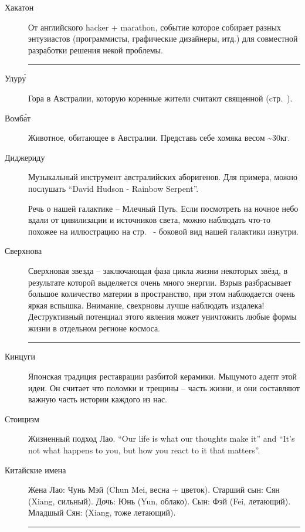 \documentclass[a5paper,11pt]{memoir}
\begin{document}
\begin{description}

\item[Хакатон] От английского hacker + marathon, событие которое собирает разных энтузиастов (программисты, графические дизайнеры, итд.) для совместной разработки решения некой проблемы. 
\fancybreak{*}

\item[Улур\'{у}] Гора в Австралии, которую коренные жители считают священной (cтр.~\pageref{uluru}).

\item[Вомб\'{а}т] Животное, обитающее в Австралии. Представь себе хомяка весом \textasciitilde30кг.

\item[Диджериду] Музыкальный инструмент австралийских аборигенов. Для примера, можно послушать ``David Hudson - Rainbow Serpent''. 

\item[] Речь о нашей галактике -- Млечный Путь. Если посмотреть на ночное небо вдали от цивилизации и источников света, можно наблюдать что-то похожее на иллюстрацию на стр.~\pageref{milky-way} - боковой вид нашей галактики изнутри.

\item[Сверхнова] Сверхновая звезда -- заключающая фаза цикла жизни некоторых звёзд, в результате которой выделяется очень много энергии. Взрыв разбрасывает большое количество материи в пространство, при этом наблюдается очень яркая вспышка. Внимание, свехрновы лучше наблюдать издалека! Деструктивный потенциал этого явления может уничтожить любые формы жизни в отдельном регионе космоса. 
\fancybreak{*}

\item[Кинцуги] Японская традиция реставрации разбитой керамики. Мыцумото адепт этой идеи. Он считает что поломки и трещины -- часть жизни, и они составляют важную часть истории каждого из нас.

\item[Стоицизм] Жизненный подход Лао. ``Our life is what our thoughts make it'' and ``It's not what happens to you, but how you react to it that matters''.

\item[Китайские имена] Жена Лао: Чунь Мэй (Chun Mei, весна + цветок). Старший сын: Сян (Xiang, сильный). Дочь: Юнь (Yun, облако). Сын: Фэй (Fei, летающий). Младшый Сян: (Xiang, тоже летающий).

\fancybreak{*}


\end{description}
\end{document}
